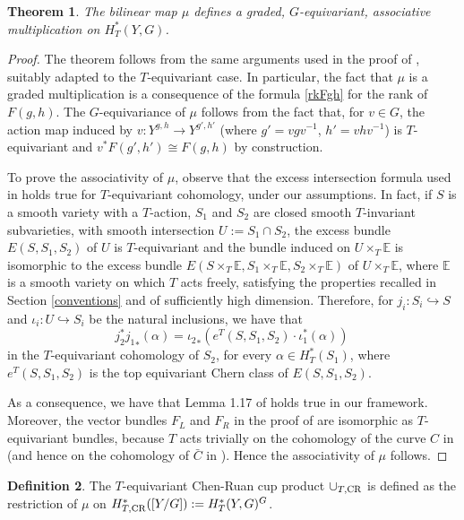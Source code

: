 \documentclass[a4paper,reqno]{amsart}
\theoremstyle{plain} %
\newtheorem{thm}{Theorem}[section]
\theoremstyle{definition} %
\newtheorem{dfn}[thm]{Definition}
\theoremstyle{remark} %
\newcommand{\E}{\mathbb{E}}
\newcommand{\1}{\mathds{1}}   %
\begin{document}
\begin{thm}
The bilinear map $\mu$ defines a graded, $G$-equivariant, associative multiplication on $H^*_T(Y, G)$. 
\end{thm}
\begin{proof}
The theorem follows from the same arguments used in the proof of \cite[Theorem 1.18]{FG03}, suitably adapted
to the $T$-equivariant case.
In particular, the fact that $\mu$ is a graded multiplication is a consequence of the formula \eqref{rkFgh} for the rank of $F(g,h)$.
The $G$-equivariance of $\mu$ follows from the fact that, for $v\in G$, the action map induced by 
$v\colon Y^{g, h} \to Y^{g', h'}$
(where $g'= vgv^{-1}$, $h'= vhv^{-1}$) is $T$-equivariant and $v^* F(g', h') \cong F(g, h)$ by construction. 

To prove the associativity of $\mu$, observe that the excess intersection formula used in \cite{FG03}
holds true for $T$-equivariant cohomology, under our assumptions. In fact, if $S$ is a smooth variety with a $T$-action, 
$S_1$ and $S_2$ are closed smooth $T$-invariant subvarieties, with smooth intersection $U:=S_1 \cap S_2$,   
the excess bundle $E(S, S_1, S_2)$ of $U$ is $T$-equivariant and the bundle induced on $U\times_T \E$
is isomorphic to the excess bundle $E(S\times_T \E, S_1\times_T \E, S_2 \times_T \E)$ of $U\times_T \E$,
where $\E$ is a smooth variety on which $T$ acts freely, satisfying the properties recalled in Section \ref{conventions}
and of sufficiently high dimension. Therefore, for $j_i \colon S_i \hookrightarrow S$
and $\iota_i \colon U \hookrightarrow S_i$ be the natural inclusions, we have that
$$
j_2^*{j_1}_* (\alpha) = {\iota_2}_* \left( e^T(S, S_1, S_2) \cdot \iota_1^*(\alpha) \right) \, 
$$
in the $T$-equivariant cohomology of $S_2$, for every  $\alpha \in H^*_T(S_1)$, where $e^T(S, S_1, S_2)$ is the top equivariant Chern class of $E(S, S_1, S_2)$. 

As a consequence, we have that  Lemma 1.17 of \cite{FG03} holds true in our framework.
Moreover, the vector bundles $F_L$ and $F_R$ in the proof of \cite[Thm. 1.18]{FG03} are isomorphic 
as $T$-equivariant bundles, because $T$ acts trivially on the cohomology of the curve $C$ in \cite[Construction 1.21]{FG03}
(and hence on the cohomology of $\bar{C}$ in \cite[Rem. 1.24]{FG03}). Hence the associativity of $\mu$ follows.
\end{proof}

\begin{dfn}
The $T$-equivariant Chen-Ruan cup product $\cup_{T, {\rm CR}}$ is defined as the restriction of $\mu$
on $H^*_{T, {\rm CR}}([Y/G]) := H^*_T(Y, G)^G $. 
\end{dfn}
\end{document}

